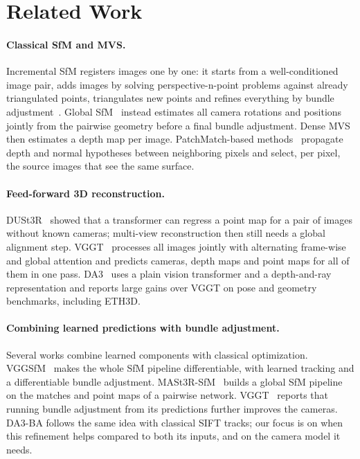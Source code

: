 \documentclass[10pt,twocolumn,letterpaper]{article}
\begin{document}
\section{Related Work}

\paragraph{Classical SfM and MVS.}
Incremental SfM registers images one by one: it starts from a well-conditioned image pair, adds images by
solving perspective-n-point problems against already triangulated points, triangulates new points and refines
everything by bundle adjustment~\cite{triggs2000ba,schonberger2016sfm}. Global SfM~\cite{pan2024glomap} instead
estimates all camera rotations and positions jointly from the pairwise geometry before a final bundle
adjustment. Dense MVS then estimates a depth map per image. PatchMatch-based methods~\cite{schonberger2016mvs}
propagate depth and normal hypotheses between neighboring pixels and select, per pixel, the source images that
see the same surface.

\paragraph{Feed-forward 3D reconstruction.}
DUSt3R~\cite{wang2024dust3r} showed that a transformer can regress a point map for a pair of images without
known cameras; multi-view reconstruction then still needs a global alignment step. VGGT~\cite{wang2025vggt}
processes all images jointly with alternating frame-wise and global attention and predicts cameras, depth maps
and point maps for all of them in one pass. DA3~\cite{lin2025da3} uses a plain vision transformer and a
depth-and-ray representation and reports large gains over VGGT on pose and geometry benchmarks, including
ETH3D.

\paragraph{Combining learned predictions with bundle adjustment.}
Several works combine learned components with classical optimization. VGGSfM~\cite{wang2024vggsfm} makes the
whole SfM pipeline differentiable, with learned tracking and a differentiable bundle adjustment.
MASt3R-SfM~\cite{duisterhof2025mast3rsfm} builds a global SfM pipeline on the matches and point maps of a
pairwise network. VGGT~\cite{wang2025vggt} reports that running bundle adjustment from its predictions further
improves the cameras. DA3-BA follows the same idea with classical SIFT tracks; our focus is on when this
refinement helps compared to both its inputs, and on the camera model it needs.
\end{document}
